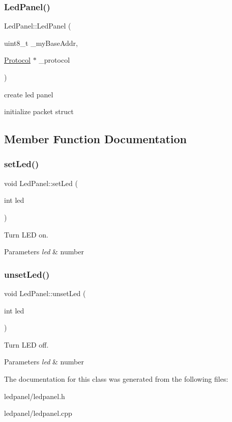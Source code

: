 \subsubsection{\texorpdfstring{Led\+Panel()}{LedPanel()}}
{\footnotesize\ttfamily Led\+Panel\+::\+Led\+Panel (\begin{DoxyParamCaption}\item[{uint8\+\_\+t}]{\+\_\+my\+Base\+Addr,  }\item[{\hyperlink{classProtocol}{Protocol} $\ast$}]{\+\_\+protocol }\end{DoxyParamCaption})\hspace{0.3cm}{\ttfamily [inline]}}



create led panel 

initialize packet struct 

\subsection{Member Function Documentation}
\mbox{\label{classLedPanel_aa6a5cdc73faf8e7f29c50c0410a63d92}} 
\subsubsection{\texorpdfstring{set\+Led()}{setLed()}}
{\footnotesize\ttfamily void Led\+Panel\+::set\+Led (\begin{DoxyParamCaption}\item[{int}]{led }\end{DoxyParamCaption})}



Turn L\+ED on. 


\begin{DoxyParams}{Parameters}
{\em led} & number \\
\hline
\end{DoxyParams}
\mbox{\label{classLedPanel_a54fbf91ef395e20cc8fed89fe048df85}} 
\subsubsection{\texorpdfstring{unset\+Led()}{unsetLed()}}
{\footnotesize\ttfamily void Led\+Panel\+::unset\+Led (\begin{DoxyParamCaption}\item[{int}]{led }\end{DoxyParamCaption})}



Turn L\+ED off. 


\begin{DoxyParams}{Parameters}
{\em led} & number \\
\hline
\end{DoxyParams}


The documentation for this class was generated from the following files\+:\begin{DoxyCompactItemize}
\item 
ledpanel/ledpanel.\+h\item 
ledpanel/ledpanel.\+cpp\end{DoxyCompactItemize}
